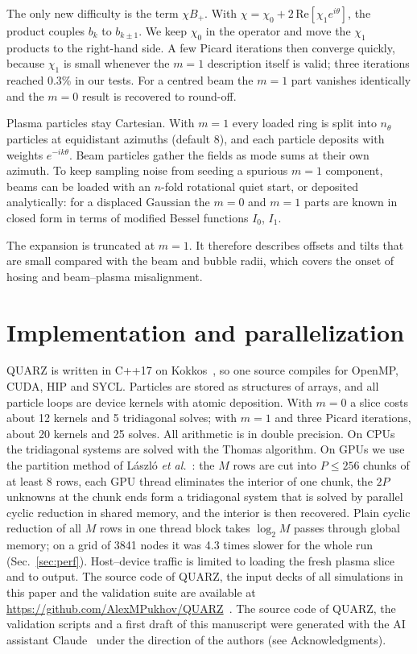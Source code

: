 \documentclass[aps,prab,reprint,floatfix,superscriptaddress,amsmath,amssymb]{revtex4-2}
\begin{document}
The only new difficulty is the term $\chi B_+$. With $\chi = \chi_0 + 2\,\mathrm{Re}[\chi_1 e^{i\theta}]$, the product couples $b_k$ to $b_{k\pm1}$. We keep $\chi_0$ in the operator and move the $\chi_1$ products to the right-hand side. A few Picard iterations then converge quickly, because $\chi_1$ is small whenever the $m=1$ description itself is valid; three iterations reached 0.3\% in our tests. For a centred beam the $m=1$ part vanishes identically and the $m=0$ result is recovered to round-off.

Plasma particles stay Cartesian. With $m=1$ every loaded ring is split into $n_\theta$ particles at equidistant azimuths (default 8), and each particle deposits with weights $e^{-ik\theta}$. Beam particles gather the fields as mode sums at their own azimuth. To keep sampling noise from seeding a spurious $m=1$ component, beams can be loaded with an $n$-fold rotational quiet start, or deposited analytically: for a displaced Gaussian the $m=0$ and $m=1$ parts are known in closed form in terms of modified Bessel functions $I_0$, $I_1$.

The expansion is truncated at $m=1$. It therefore describes offsets and tilts that are small compared with the beam and bubble radii, which covers the onset of hosing and beam--plasma misalignment.

\section{Implementation and parallelization}\label{sec:impl}

QUARZ is written in C++17 on Kokkos~\cite{Trott2022}, so one source compiles for OpenMP, CUDA, HIP and SYCL. Particles are stored as structures of arrays, and all particle loops are device kernels with atomic deposition. With $m=0$ a slice costs about 12 kernels and 5 tridiagonal solves; with $m=1$ and three Picard iterations, about 20 kernels and 25 solves. All arithmetic is in double precision. On CPUs the tridiagonal systems are solved with the Thomas algorithm. On GPUs we use the partition method of L\'aszl\'o \textit{et al.}~\cite{Laszlo2016}: the $M$ rows are cut into $P\le 256$ chunks of at least 8 rows, each GPU thread eliminates the interior of one chunk, the $2P$ unknowns at the chunk ends form a tridiagonal system that is solved by parallel cyclic reduction in shared memory, and the interior is then recovered. Plain cyclic reduction of all $M$ rows in one thread block takes $\log_2 M$ passes through global memory; on a grid of 3841 nodes it was 4.3 times slower for the whole run (Sec.~\ref{sec:perf}). Host--device traffic is limited to loading the fresh plasma slice and to output. The source code of QUARZ, the input decks of all simulations in this paper and the validation suite are available at \url{https://github.com/AlexMPukhov/QUARZ}~\cite{QUARZ}. The source code of QUARZ, the validation scripts and a first draft of this manuscript were generated with the AI assistant Claude~\cite{Claude} under the direction of the authors (see Acknowledgments).
\end{document}
